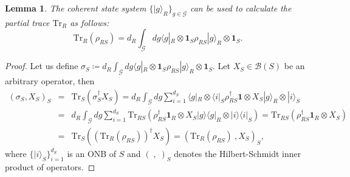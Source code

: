 \documentclass[aps,10pt,twocolumn,showpacs,pra,citeautoscript,amsmath,amssymb,floatfix,superscriptaddress]{revtex4-1}
\newtheorem{lemma}{Lemma}
\def\Tr{{\mathrm{Tr}}}
\newcommand{\cg}{\mathcal G}
\newcommand{\ket}[1]{|#1\rangle}
\newcommand{\bra}[1]{\langle #1|}
\begin{document}
\begin{lemma}
The coherent state system $\{\ket{g}_R\}_{g\in\mathcal{G}}$ can be used to calculate the partial trace $\Tr_R$ as follows:
\begin{equation*}
\Tr_R\left(\rho_{RS}\right)=d_R\int_{\cg} dg \bra{g}_R \otimes \mathbf{1}_S \rho_{RS}\ket{g}_R \otimes \mathbf{1}_S .
\end{equation*}
\label{partraceandg}
\end{lemma}
\begin{proof}
Let us define $\displaystyle\sigma_S\coloneqq d_R\int_{\cg} dg \bra{g}_R \otimes \mathbf{1}_S \rho_{RS}\ket{g}_R \otimes \mathbf{1}_S$. Let $X_S\in\mathcal{B}(S)$ be an arbitrary operator, then
\begin{eqnarray*}
\left(\sigma_S, X_S\right)_S&=&\Tr_S \left(\sigma^{\dagger}_S X_S\right)= d_R\int_{\cg} dg \sum_{i=1}^{d_S} \bra{g}_R \otimes \bra{i}_S \rho^\dagger_{RS}\mathbf{1}\otimes X_S \ket{g}_R \otimes \ket{i}_S \nonumber\\
&=& d_R\int_{\cg} dg\sum_{i=1}^{d_S} \Tr_{RS}\left(\rho^\dagger_{RS}\mathbf{1}_R\otimes X_S \ket{g}\bra{g}_R\otimes \ket{i}\bra{i}_S\right)= \Tr_{RS}\left(\rho^\dagger_{RS}\mathbf{1}_R\otimes X_S \right)\nonumber\\
&=& \Tr_S\left(\left(\Tr_R(\rho_{RS})\right)^\dagger X_S\right)=\left(\Tr_R(\rho_{RS})\ , X_S\right)_S,
\end{eqnarray*}
where $\{\ket{i}_S\}_{i=1}^{d_S}$ is an ONB of $S$ and $\left(\;,\;\right)_S$ denotes the Hilbert-Schmidt inner product of operators.
\end{proof}
\end{document}
